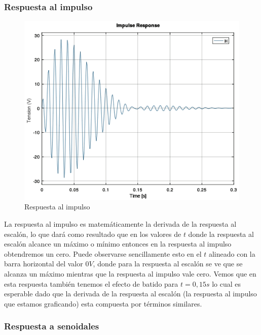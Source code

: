 \documentclass[11pt,a4paper]{report}
\begin{document}
\newpage
\subsubsection*{Respuesta al impulso}

\begin{figure}[h!]
\includegraphics[scale=0.7]{RtaImpulso.png}
\caption{Respuesta al impulso}
\end{figure}

La respuesta al impulso es matemáticamente la derivada de la respuesta al escalón,
lo que dará como resultado que en los valores de $t$ donde la respuesta al escalón
alcance un máximo o mínimo entonces en la respuesta al impulso obtendremos un cero.
Puede observarse sencillamente esto en el $t$ alineado con la barra horizontal 
del valor $0 V$, donde para la respuesta al escalón se ve que se alcanza un máximo
mientras que la respuesta al impulso vale cero. Vemos que en esta respuesta también
tenemos el efecto de batido para $t = 0,15s$ lo cual es esperable dado que la derivada de la respuesta al escalón (la respuesta al impulso que estamos graficando) esta compuesta por términos similares.


\newpage
\subsubsection*{Respuesta a senoidales}
\end{document}
